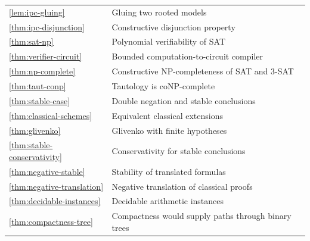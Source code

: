 \begin{longtable}{@{}p{}p{}@{}}
\ref{lem:ipc-gluing} & Gluing two rooted models \\
\ref{thm:ipc-disjunction} & Constructive disjunction property \\
\ref{thm:sat-np} & Polynomial verifiability of SAT \\
\ref{thm:verifier-circuit} & Bounded computation-to-circuit compiler \\
\ref{thm:np-complete} & Constructive NP-completeness of SAT and 3-SAT \\
\ref{thm:taut-conp} & Tautology is coNP-complete \\
\ref{thm:stable-case} & Double negation and stable conclusions \\
\ref{thm:classical-schemes} & Equivalent classical extensions \\
\ref{thm:glivenko} & Glivenko with finite hypotheses \\
\ref{thm:stable-conservativity} & Conservativity for stable conclusions \\
\ref{thm:negative-stable} & Stability of translated formulas \\
\ref{thm:negative-translation} & Negative translation of classical proofs \\
\ref{thm:decidable-instances} & Decidable arithmetic instances \\
\ref{thm:compactness-tree} & Compactness would supply paths through binary trees \\
\end{longtable}
\normalsize
